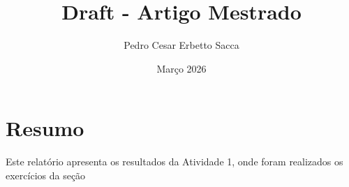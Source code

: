 \documentclass{article}
\title{Draft - Artigo Mestrado}
\author{Pedro Cesar Erbetto Sacca}
\date{Março 2026}
\begin{document}
\maketitle

\section{Resumo}
Este relatório apresenta os resultados da Atividade 1, onde foram realizados os exercícios da seção
\end{document}
